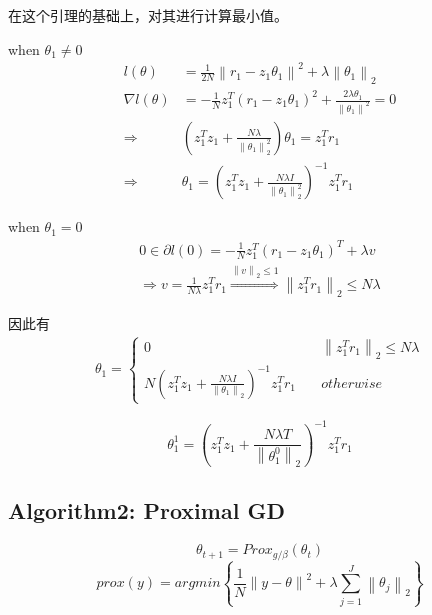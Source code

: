 \documentclass[lang=cn,11pt,a4paper]{elegantpaper}
\theoremstyle{plain}
\theoremstyle{remark}
\begin{document}
在这个引理的基础上，对其进行计算最小值。

when $ \theta_1 \ne 0$ 
\begin{equation*}
    \begin{aligned}
    l(\theta) &= \frac{1}{2N} \left\| r_1-z_1\theta_1 \right\| ^2 + \lambda \left\| \theta_1 \right\| _2\\
    \nabla {l(\theta)} &= -\frac{1}{N} z_1^T(r_1-z_1\theta_1)^2+\frac{2\lambda\theta_1}{\left\| \theta_1 \right\|^2 } = 0\\\Rightarrow&(z_1^Tz_1+\frac{N\lambda}{\left\| \theta_1 \right\| _2^2})\theta_1 = z_1^Tr_1\\
    \Rightarrow&\theta_1 = (z_1^Tz_1+\frac{N\lambda I}{\left\| \theta_1 \right\|_2^2 })^{-1}z_1^Tr_1
    \end{aligned}
\end{equation*}

when $\theta_1 = 0$ 
\begin{equation*}
    \begin{aligned}
        0 \in \partial l(0) = -\frac{1}{N} z_1^T(r_1 - z_1\theta_1)^T+\lambda v\\
        \Rightarrow v = \frac{1}{N\lambda} z_1^Tr_1 
        \overset{\left\| v \right\| _2 \leq 1}{\Rightarrow} \left\| z_1^Tr_1 \right\|_2 \leq N\lambda  
    \end{aligned}
\end{equation*}

因此有
\begin{equation*}
    \begin{aligned}
        \theta_1 = \left\{\begin{array}{ll}
            0\quad& \left\| z_1^Tr_1 \right\|_2 \leq N\lambda\\
            N(z_1^Tz_1 + \frac{N\lambda I}{\left\| \theta_1 \right\| _2})^{-1}z_1^Tr_1 \quad& otherwise
        \end{array}\right.
    \end{aligned}
\end{equation*}

\begin{equation*}
    \theta_1^1 = (z_1^Tz_1+\frac{N\lambda T}{\left\| \theta_1^0 \right\|_2 })^{-1} z_1^Tr_1
\end{equation*}

\subsection{Algorithm2: Proximal GD}
$$ \theta_{t+1} = Prox_{g/\beta}(\theta_t) $$
$$ prox(y) = argmin \left\{ \frac{1}{N} \left\| y-\theta \right\|^2+\lambda \sum_{j=1}^{J}\left\| \theta_j \right\| _2  \right\}  $$
\end{document}
